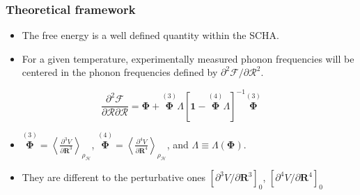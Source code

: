 \documentclass{beamer}
\begin{document}
\begin{frame}

\frametitle{Theoretical framework}
\begin{itemize}
 \item The free energy is a well defined quantity within the SCHA.
 \item For a given temperature, experimentally measured phonon frequencies will be centered in the phonon frequencies defined by $\partial^{2}\mathcal{F}/\partial\boldsymbol{\mathcal{R}}^{2}$.
\end{itemize}
\begin{equation}
\nonumber
 \frac{\partial^{2}\mathcal{F}}{\partial\boldsymbol{\mathcal{R}}\partial\boldsymbol{\mathcal{R}}}=\boldsymbol{\Phi}+\overset{(3)}{\boldsymbol{\Phi}}\Lambda[\boldsymbol{1}-\overset{(4)}{\boldsymbol{
 \Phi}}\Lambda]^{-1}\overset{(3)}{\boldsymbol{\Phi}}
\end{equation}
\begin{itemize}
 \item $\overset{(3)}{\boldsymbol{\Phi}}=\left\langle\frac{\partial^{3}V}{\partial\boldsymbol{R}^{3}}\right\rangle_{\rho_{\mathcal{H}}}$, \hspace{0.2cm}
       $\overset{(4)}{\boldsymbol{\Phi}}=\left\langle\frac{\partial^{4}V}{\partial\boldsymbol{R}^{4}}\right\rangle_{\rho_{\mathcal{H}}}$, and
       $\Lambda\equiv\Lambda(\boldsymbol{\Phi})$.
\item They are different to the perturbative ones $[\partial^{3}V/\partial\boldsymbol{R}^{3}]_{0}$, $[\partial^{4}V/\partial\boldsymbol{R}^{4}]_{0}$
\end{itemize}

\end{frame}

\end{document}
